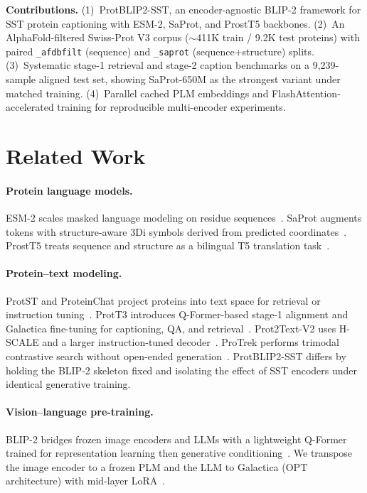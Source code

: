 \documentclass[conference]{IEEEtran}
\begin{document}
\textbf{Contributions.}
(1)~ProtBLIP2-SST, an encoder-agnostic BLIP-2 framework for SST protein captioning with ESM-2, SaProt, and ProstT5 backbones.
(2)~An AlphaFold-filtered Swiss-Prot V3 corpus ($\sim$411K train / 9.2K test proteins) with paired \texttt{\_afdbfilt} (sequence) and \texttt{\_saprot} (sequence+structure) splits.
(3)~Systematic stage-1 retrieval and stage-2 caption benchmarks on a 9{,}239-sample aligned test set, showing SaProt-650M as the strongest variant under matched training.
(4)~Parallel cached PLM embeddings and FlashAttention-accelerated training for reproducible multi-encoder experiments.

\section{Related Work}
\label{sec:related}

\paragraph{Protein language models.}
ESM-2 scales masked language modeling on residue sequences~\cite{lin2023esm2,rives2021biological}.
SaProt augments tokens with structure-aware 3Di symbols derived from predicted coordinates~\cite{su2023saprot}.
ProstT5 treats sequence and structure as a bilingual T5 translation task~\cite{heinzinger2024prostt5,elnaggar2021prottrans}.

\paragraph{Protein--text modeling.}
ProtST and ProteinChat project proteins into text space for retrieval or instruction tuning~\cite{xu2023protst,guo2023proteinchat}.
ProtT3 introduces Q-Former-based stage-1 alignment and Galactica fine-tuning for captioning, QA, and retrieval~\cite{liu2024prott3}.
Prot2Text-V2 uses H-SCALE and a larger instruction-tuned decoder~\cite{fei2025prot2text}.
ProTrek performs trimodal contrastive search without open-ended generation~\cite{su2025protrek}.
ProtBLIP2-SST differs by holding the BLIP-2 skeleton fixed and isolating the effect of SST encoders under identical generative training.

\paragraph{Vision--language pre-training.}
BLIP-2 bridges frozen image encoders and LLMs with a lightweight Q-Former trained for representation learning then generative conditioning~\cite{li2023blip2}.
We transpose the image encoder to a frozen PLM and the LLM to Galactica (OPT architecture) with mid-layer LoRA~\cite{hu2022lora,taylor2022galactica}.
\end{document}
